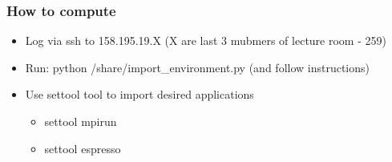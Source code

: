 \documentclass{beamer}
\begin{document}
\begin{frame}
  \frametitle{How to compute}
  \begin{itemize}
    \item Log via ssh to 158.195.19.X (X are last 3 mubmers of lecture room - 259)
    \item Run: python /share/import\_environment.py (and follow instructions)
    \item Use settool tool to import desired applications
    \begin{itemize}
      \item settool mpirun
      \item settool espresso
    \end{itemize}
  \end{itemize}
\end{frame}
\end{document}
